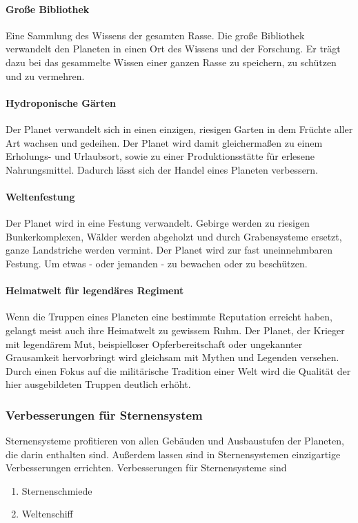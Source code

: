 \documentclass[11pt, a4paper]{article}
\begin{document}
\paragraph{Große Bibliothek}
Eine Sammlung des Wissens der gesamten Rasse. Die große Bibliothek verwandelt den Planeten in einen Ort des
Wissens und der Forschung. Er trägt dazu bei das gesammelte Wissen einer ganzen Rasse zu speichern, zu schützen
und zu vermehren.
%
\paragraph{Hydroponische Gärten}
Der Planet verwandelt sich in einen einzigen, riesigen Garten in dem Früchte aller Art wachsen und gedeihen.
Der Planet wird damit gleichermaßen zu einem Erholungs- und Urlaubsort, sowie zu einer Produktionsstätte für
erlesene Nahrungsmittel. Dadurch lässt sich der Handel eines Planeten verbessern.
%
\paragraph{Weltenfestung}
Der Planet wird in eine Festung verwandelt. Gebirge werden zu riesigen Bunkerkomplexen, Wälder werden abgeholzt
und durch Grabensysteme ersetzt, ganze Landstriche werden vermint. Der Planet wird zur fast uneinnehmbaren
Festung. Um etwas - oder jemanden - zu bewachen oder zu beschützen.
%
\paragraph{Heimatwelt für legendäres Regiment}
Wenn die Truppen eines Planeten eine bestimmte Reputation erreicht haben, gelangt meist auch ihre Heimatwelt
zu gewissem Ruhm. Der Planet, der Krieger mit legendärem Mut, beispielloser Opferbereitschaft oder ungekannter
Grausamkeit hervorbringt wird gleichsam mit Mythen und Legenden versehen. Durch einen Fokus auf die
militärische Tradition einer Welt wird die Qualität der hier ausgebildeten Truppen deutlich erhöht.
%
\subsubsection{Verbesserungen für Sternensystem}
Sternensysteme profitieren von allen Gebäuden und Ausbaustufen der Planeten, die darin enthalten sind.
Außerdem lassen sind in Sternensystemen einzigartige Verbesserungen errichten.
Verbesserungen für Sternensysteme sind
\begin{enumerate}
	\item Sternenschmiede
	\item Weltenschiff
\end{enumerate}
%
\end{document}
